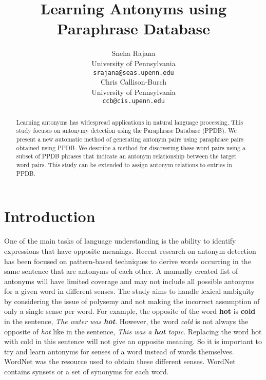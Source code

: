 \documentclass[11pt]{article}
\title{Learning Antonyms using Paraphrase Database}
\author{Sneha Rajana \\
  University of Pennsylvania\\
  {\tt srajana@seas.upenn.edu} \\\And
  Chris Callison-Burch \\
  University of Pennsylvania\\
  {\tt ccb@cis.upenn.edu} \\}
\date{}
\begin{document}
\maketitle
\begin{abstract}
Learning antonyms has widespread applications in natural language processing. This study focuses on antonymy detection using the Paraphrase Database (PPDB). We present a new automatic method of generating antonym pairs using paraphrase pairs obtained using PPDB. We describe a method for discovering these word pairs using a subset of PPDB phrases that indicate an antonym relationship between the target word pairs. This study can be extended to assign antonym relations to entries in PPDB. 
\end{abstract}

\section{Introduction}
 One of the main tasks of language understanding is the ability to identify expressions that have opposite meanings. Recent research on antonym detection has been focused on pattern-based techniques to derive words occurring in the same sentence that are antonyms of each other. A manually created list of antonyms will have limited coverage and may not include all possible antonyms for a given word in different senses. The study aims to handle lexical ambiguity by considering the issue of polysemy and not making the incorrect assumption of only a single sense per word. For example, the opposite of the word \textbf{hot} is \textbf{cold} in the sentence, \textit{The water was \textbf{hot}}. However, the word \textit{cold} is not always the opposite of \textit{hot} like in the sentence, \textit{This was a \textbf{hot} topic}. Replacing the word hot with cold in this sentence will not give an opposite meaning. So it is important to try and learn antonyms for senses of a word instead of words themselves. WordNet was the resource used to obtain these different senses. WordNet contains synsets or a set of synonyms for each word. 
 
\end{document}
